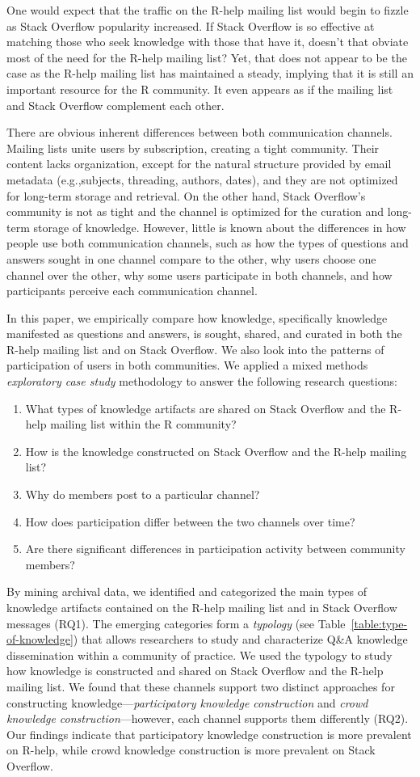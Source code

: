 \documentclass[smallextended]{svjour3}       %
\newcommand{\channel}{communication channel\xspace}
\newcommand{\channels}{communication channels\xspace}
\newcommand{\SO}{Stack Overflow\xspace}
\newcommand{\RH}{R-help\xspace}
\newcommand{\rqa}{What types of knowledge artifacts are shared on Stack Overflow and the R-help mailing list within the R community?}
\newcommand{\rqb}{How is the knowledge constructed on Stack Overflow and the R-help mailing list?}
\newcommand{\rqc}{Why do members post to a particular channel?}
\newcommand{\rqd}{How does participation differ between the two channels over time?}
\newcommand{\rqe}{Are there significant differences in participation activity between community members?}
\begin{document}
One would expect that the traffic on the \RH mailing list would begin
to fizzle as \SO popularity increased. If \SO is so effective at
matching those who seek knowledge with those that have it, doesn't
that obviate most of the need for the \RH mailing list? Yet, that does
not appear to be the case as the \RH mailing list has maintained a
steady, implying that it is still an important resource for the R
community. It even appears as if the mailing list and \SO complement
each other.

There are obvious inherent differences between both \channels. Mailing lists unite users by subscription, creating a tight community. Their content lacks organization, except for the natural structure provided by email metadata (e.g.,subjects, threading, authors, dates), and they are not optimized for long-term storage and retrieval. On the other hand, \SO's community is not as tight and the channel is optimized for the curation and long-term storage of knowledge. However, little is known about the differences in how people use both \channels, such as how the types of questions and answers sought in one channel compare to the other, why users choose one channel over the other, why some users participate in both channels, and how participants perceive each \channel.



In this paper, we empirically compare how
knowledge, specifically knowledge manifested as questions and answers,
is sought, shared, and curated in both the \RH mailing list and on
\SO.  We also look into the patterns of participation of users in both
communities. 
We applied a mixed methods \textit{exploratory case study}
methodology to answer the following research questions:

\begin{enumerate}[label=\bfseries{RQ\arabic*.},itemsep=3pt, topsep=2pt, leftmargin=3em, parsep=0pt]
\item \rqa
\item \rqb
\item \rqc
\item \rqd
\item \rqe
\end{enumerate}

By mining archival data, we identified and categorized the main types
of knowledge artifacts contained on the \RH mailing list and in \SO
messages (RQ1). The emerging categories form a \textit{typology} (see
Table~\ref{table:type-of-knowledge}) that
allows researchers to study and characterize Q\&A knowledge
dissemination within a community of practice. We used the typology to
study how knowledge is constructed and shared on \SO and the \RH
mailing list. We found that these channels support two distinct
approaches for constructing knowledge---\textit{participatory
  knowledge construction} and \textit{crowd knowledge
  construction}---however, each channel supports them differently
(RQ2). Our findings indicate that participatory knowledge construction
is more prevalent on \RH, while crowd knowledge construction is more
prevalent on \SO.
\end{document}
